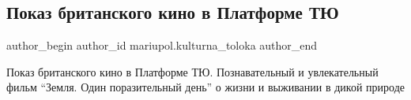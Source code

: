 
 
 
 
 

\subsection{Показ британского кино в Платформе ТЮ}
\label{sec:09_02_2019.fb.mariupol.kulturna_toloka.1.pokaz_britanskogo_kino_v_platforme_tju}

\ifcmt
 author_begin
   author_id mariupol.kulturna_toloka
 author_end
\fi

Показ британского кино в Платформе ТЮ. Познавательный и увлекательный фильм
\enquote{Земля. Один поразительный день} о жизни и выживании в дикой природе
